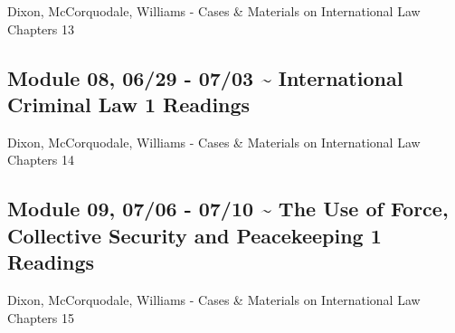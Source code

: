 \documentclass[10pt,]{article}
\begin{document}
Dixon, McCorquodale, Williams - Cases \& Materials on International Law
Chapters 13

\hypertarget{module-08-0629---0703-international-criminal-law-1-readings}{%
\subsection{Module 08, 06/29 - 07/03 \textasciitilde{} International
Criminal Law \textbar{} 1
Readings}\label{module-08-0629---0703-international-criminal-law-1-readings}}

Dixon, McCorquodale, Williams - Cases \& Materials on International Law
Chapters 14

\hypertarget{module-09-0706---0710-the-use-of-force-collective-security-and-peacekeeping-1-readings}{%
\subsection{Module 09, 07/06 - 07/10 \textasciitilde{} The Use of Force,
Collective Security and Peacekeeping \textbar{} 1
Readings}\label{module-09-0706---0710-the-use-of-force-collective-security-and-peacekeeping-1-readings}}

Dixon, McCorquodale, Williams - Cases \& Materials on International Law
Chapters 15
\end{document}
